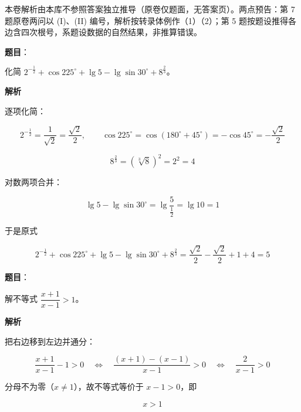 

\begin{gktip}
本卷解析由本库不参照答案独立推导（原卷仅题面，无答案页）。两点预告：第 7 题原卷两问以 (I)、(II) 编号，解析按转录体例作（1）（2）；第 5 题按题设推得各边含四次根号，系题设数据的自然结果，非推算错误。
\end{gktip}

\begin{answer}

\textbf{题目}：

化简 $2^{-\frac12}+\cos 225^\circ+\lg 5-\lg\sin 30^\circ+8^{\frac23}$。

\textbf{解析}

逐项化简：

\nopagebreak[4]
\[
2^{-\frac12}=\frac{1}{\sqrt2}=\frac{\sqrt2}{2},\qquad
\cos 225^\circ=\cos(180^\circ+45^\circ)=-\cos 45^\circ=-\frac{\sqrt2}{2}
\]

\nopagebreak[4]
\[
8^{\frac23}=\left(\sqrt[3]{8}\right)^2=2^2=4
\]

对数两项合并：

\nopagebreak[4]
\[
\lg 5-\lg\sin 30^\circ=\lg\frac{5}{\frac12}=\lg 10=1
\]

于是原式

\nopagebreak[4]
\[
2^{-\frac12}+\cos 225^\circ+\lg 5-\lg\sin 30^\circ+8^{\frac23}
=\frac{\sqrt2}{2}-\frac{\sqrt2}{2}+1+4=5
\]


\end{answer}
\begin{answer}

\textbf{题目}：

解不等式 $\dfrac{x+1}{x-1}>1$。

\textbf{解析}

把右边移到左边并通分：

\nopagebreak[4]
\[
\frac{x+1}{x-1}-1>0
\quad\Longleftrightarrow\quad
\frac{(x+1)-(x-1)}{x-1}>0
\quad\Longleftrightarrow\quad
\frac{2}{x-1}>0
\]

分母不为零（$x\neq 1$），故不等式等价于 $x-1>0$，即

\nopagebreak[4]
\[
x>1
\]


\end{answer}
